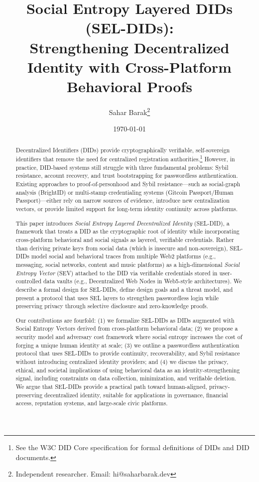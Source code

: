\documentclass[11pt]{article}
\title{
  Social Entropy Layered DIDs (SEL-DIDs):\\
  Strengthening Decentralized Identity with Cross-Platform Behavioral Proofs
}
\author{
  Sahar Barak\thanks{Independent researcher. Email: hi@saharbarak.dev}
}
\date{\today}
\begin{document}
\maketitle

\begin{abstract}
Decentralized Identifiers (DIDs) provide cryptographically verifiable, self-sovereign identifiers that remove the need for centralized registration authorities.\footnote{See the W3C DID Core specification for formal definitions of DIDs and DID documents.} However, in practice, DID-based systems still struggle with three fundamental problems: Sybil resistance, account recovery, and trust bootstrapping for passwordless authentication. Existing approaches to proof-of-personhood and Sybil resistance---such as social-graph analysis (BrightID) or multi-stamp credentialing systems (Gitcoin Passport/Human Passport)---either rely on narrow sources of evidence, introduce new centralization vectors, or provide limited support for long-term identity continuity across platforms.

This paper introduces \emph{Social Entropy Layered Decentralized Identity} (SEL-DID), a framework that treats a DID as the cryptographic root of identity while incorporating cross-platform behavioral and social signals as layered, verifiable credentials. Rather than deriving private keys from social data (which is insecure and non-sovereign), SEL-DIDs model social and behavioral traces from multiple Web2 platforms (e.g., messaging, social networks, content and music platforms) as a high-dimensional \emph{Social Entropy Vector} (SEV) attached to the DID via verifiable credentials stored in user-controlled data vaults (e.g., Decentralized Web Nodes in Web5-style architectures). We describe a formal design for SEL-DIDs, define design goals and a threat model, and present a protocol that uses SEL layers to strengthen passwordless login while preserving privacy through selective disclosure and zero-knowledge proofs.

Our contributions are fourfold: (1) we formalize SEL-DIDs as DIDs augmented with Social Entropy Vectors derived from cross-platform behavioral data; (2) we propose a security model and adversary cost framework where social entropy increases the cost of forging a unique human identity at scale; (3) we outline a passwordless authentication protocol that uses SEL-DIDs to provide continuity, recoverability, and Sybil resistance without introducing centralized identity providers; and (4) we discuss the privacy, ethical, and societal implications of using behavioral data as an identity-strengthening signal, including constraints on data collection, minimization, and verifiable deletion. We argue that SEL-DIDs provide a practical path toward human-aligned, privacy-preserving decentralized identity, suitable for applications in governance, financial access, reputation systems, and large-scale civic platforms.
\end{abstract}
\end{document}
